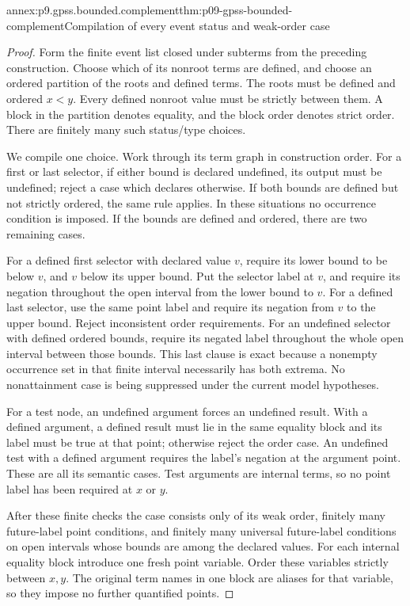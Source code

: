 \begin{annexitem}{annex:p9.gpss.bounded.complement}{thm:p09-gpss-bounded-complement}{Compilation of every event status and weak-order case}
\begin{proof}
Form the finite event list closed
under subterms from the preceding
construction. Choose which of
its nonroot terms are defined,
and choose an ordered partition
of the roots and defined terms.
The roots must be defined and
ordered \(x<y\). Every defined
nonroot value must be strictly
between them. A block in the
partition denotes equality, and
the block order denotes strict
order. There are finitely many
such status/type choices.

We compile one choice. Work
through its term graph in
construction order. For a first
or last selector, if either bound
is declared undefined, its output
must be undefined; reject a case
which declares otherwise. If both
bounds are defined but not strictly
ordered, the same rule applies.
In these situations no occurrence
condition is imposed. If the
bounds are defined and ordered,
there are two remaining cases.

For a defined first selector with
declared value \(v\), require
its lower bound to be below
\(v\), and \(v\) below its
upper bound. Put the selector
label at \(v\), and require
its negation throughout the
open interval from the lower
bound to \(v\). For a defined
last selector, use the same
point label and require its
negation from \(v\) to the
upper bound. Reject inconsistent
order requirements. For an
undefined selector with defined
ordered bounds, require its
negated label throughout the
whole open interval between
those bounds. This last clause
is exact because a nonempty
occurrence set in that finite
interval necessarily has both
extrema. No nonattainment case
is being suppressed under the
current model hypotheses.

For a test node, an undefined
argument forces an undefined
result. With a defined argument,
a defined result must lie in
the same equality block and
its label must be true at
that point; otherwise reject
the order case. An undefined
test with a defined argument
requires the label's negation
at the argument point. These
are all its semantic cases.
Test arguments are internal
terms, so no point label has
been required at \(x\) or
\(y\).

After these finite checks the
case consists only of its
weak order, finitely many
future-label point conditions,
and finitely many universal
future-label conditions on
open intervals whose bounds
are among the declared values.
For each internal equality
block introduce one fresh
point variable. Order these
variables strictly between
\(x,y\). The original term
names in one block are
aliases for that variable,
so they impose no further
quantified points.


\end{proof}
\end{annexitem}
